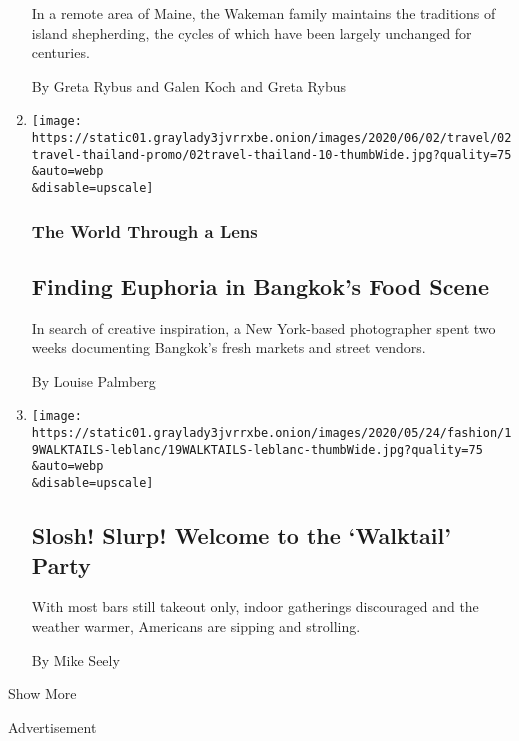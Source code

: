 \begin{enumerate}
  In a remote area of Maine, the Wakeman family maintains the traditions
  of island shepherding, the cycles of which have been largely unchanged
  for centuries.

  By Greta Rybus and Galen Koch and Greta Rybus
\item
  \href{/2020/06/01/travel/bangkok-thailand-food-markets.html}{}

  \texttt{[image: https://static01.graylady3jvrrxbe.onion/images/2020/06/02/travel/02travel-thailand-promo/02travel-thailand-10-thumbWide.jpg?quality=75\\\&auto=webp\\\&disable=upscale]}

  \hypertarget{the-world-through-a-lens-1}{%
  \subsubsection{The World Through a
  Lens}\label{the-world-through-a-lens-1}}

  \hypertarget{finding-euphoria-in-bangkoks-food-scene}{%
  \subsection{Finding Euphoria in Bangkok's Food
  Scene}\label{finding-euphoria-in-bangkoks-food-scene}}

  In search of creative inspiration, a New York-based photographer spent
  two weeks documenting Bangkok's fresh markets and street vendors.

  By Louise Palmberg
\item
  \href{/2020/05/20/style/cocktails-to-go.html}{}

  \texttt{[image: https://static01.graylady3jvrrxbe.onion/images/2020/05/24/fashion/19WALKTAILS-leblanc/19WALKTAILS-leblanc-thumbWide.jpg?quality=75\\\&auto=webp\\\&disable=upscale]}

  \hypertarget{slosh-slurp-welcome-to-the-walktail-party}{%
  \subsection{Slosh! Slurp! Welcome to the `Walktail'
  Party}\label{slosh-slurp-welcome-to-the-walktail-party}}

  With most bars still takeout only, indoor gatherings discouraged and
  the weather warmer, Americans are sipping and strolling.

  By Mike Seely
\end{enumerate}

Show More

Advertisement

